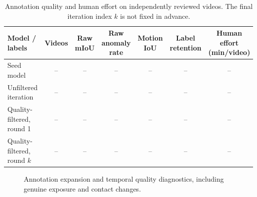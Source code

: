 \begin{table}[!t]
\caption{Annotation quality and human effort on independently reviewed videos. The final iteration index $k$ is not fixed in advance.}
\label{tab:annotationquality}
\centering\small
\setlength{\tabcolsep}{5pt}
\begin{tabular}{lcccccc}
\toprule
Model / labels & Videos & Raw mIoU & \shortstack{Raw anomaly\\rate} & Motion IoU & \shortstack{Label\\retention} & \shortstack{Human effort\\(min/video)}\\
\midrule
Seed model & -- & -- & -- & -- & -- & --\\
Unfiltered iteration & -- & -- & -- & -- & -- & --\\
Quality-filtered, round 1 & -- & -- & -- & -- & -- & --\\
Quality-filtered, round $k$ & -- & -- & -- & -- & -- & --\\
\bottomrule
\end{tabular}
\end{table}

\begin{figure}[!tb]
\centering
\caption{Annotation expansion and temporal quality diagnostics, including genuine exposure and contact changes.}
\label{fig:annotationquality}
\end{figure}

